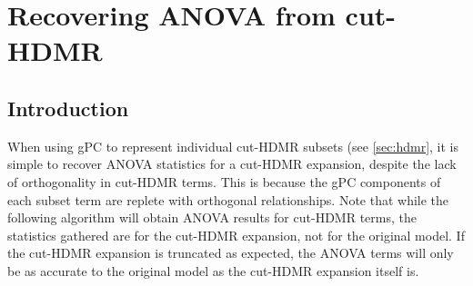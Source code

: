 
\chapter{Recovering ANOVA from cut-HDMR} %

\label{apx:cut anova} %



\section{Introduction}\label{sec:cut to anova}
When using gPC to represent individual cut-HDMR subsets (see \ref{sec:hdmr}, it is simple to recover ANOVA statistics for a
cut-HDMR expansion, despite the lack of orthogonality in cut-HDMR terms.  This is because the gPC components
of each subset term are replete with orthogonal relationships.  Note that while the following algorithm will
obtain ANOVA results for cut-HDMR terms, the statistics gathered are for the cut-HDMR expansion, not for the
original model.  If the cut-HDMR expansion is truncated as expected, the ANOVA terms will only be as accurate
to the original model as the cut-HDMR expansion itself is.

